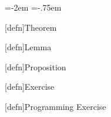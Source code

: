 \theorempreskipamount=-2em
\theorempostskipamount=-.75em

\theoremprework{\begin{onehalfspace}} \theorempostwork{\end{onehalfspace}}
[defn]{Theorem}

\theoremprework{\begin{onehalfspace}} \theorempostwork{\end{onehalfspace}}
[defn]{Lemma}

\newcommand\stmtword{Proposition}
\theoremprework{\begin{onehalfspace}} \theorempostwork{\end{onehalfspace}}
[defn]{\stmtword}

\theoremprework{\begin{onehalfspace}} \theorempostwork{\end{onehalfspace}}
[defn]{Exercise}

\theoremprework{\begin{onehalfspace}} \theorempostwork{\end{onehalfspace}}
[defn]{Programming Exercise}


\newenvironment{exersoln}[1]{\textbf{Exercise #1 Solution.}\begin{quote}}{\end{quote}}
\newenvironment{stmtsoln}[1]{\textbf{\stmtword\ #1 Proof.}\begin{quote}}{\end{quote}}
\newenvironment{thmsoln}[1]{\textbf{Theorem #1 Proof.}\begin{quote}}{\end{quote}}
\newcommand\answer{\par\textbf{\emph{Answer}.\ }}
\newcommand\proof{\par\textbf{\emph{Proof}.\ }}

\newenvironment{exenumerate}{\begin{enumerate}[label=(\alph*),leftmargin=3em]}{\end{enumerate}}
\newenvironment{discussion}{\begin{leftbar}\noindent}{\end{leftbar}}

